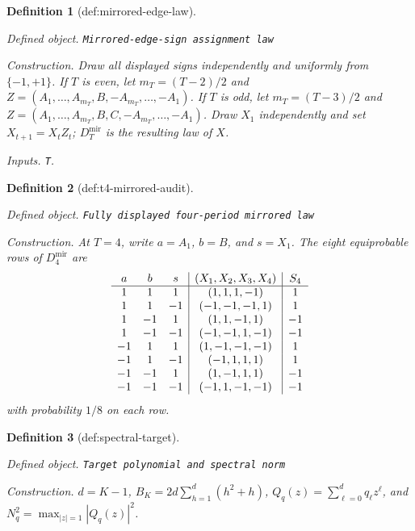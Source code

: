 \documentclass{article}
\newtheorem{definition}{Definition}
\begin{document}
\begin{definition}[def:mirrored-edge-law]\label{def:mirrored-edge-law}
\par\smallskip\noindent\emph{Defined object.} \texttt{Mirrored-\allowbreak{}edge-\allowbreak{}sign assignment law}
\par\smallskip\noindent\emph{Construction.} Draw all displayed signs independently and uniformly from \(\{-1,+1\}\). If \(T\) is even, let \(m_T=(T-2)/2\) and \(Z=(A_1,\ldots,A_{m_T},B,-A_{m_T},\ldots,-A_1)\). If \(T\) is odd, let \(m_T=(T-3)/2\) and \(Z=(A_1,\ldots,A_{m_T},B,C,-A_{m_T},\ldots,-A_1)\). Draw \(X_1\) independently and set \(X_{t+1}=X_tZ_t\); \(D_T^{\mathrm{mir}}\) is the resulting law of \(X\).
\par\smallskip\noindent\emph{Inputs.} \texttt{T}.
\end{definition}

\begin{definition}[def:t4-mirrored-audit]\label{def:t4-mirrored-audit}
\par\smallskip\noindent\emph{Defined object.} \texttt{Fully displayed four-\allowbreak{}period mirrored law}
\par\smallskip\noindent\emph{Construction.} At \(T=4\), write \(a=A_1\), \(b=B\), and \(s=X_1\). The eight equiprobable rows of \(D_4^{\mathrm{mir}}\) are \[\begin{array}{c c c|c|c}a&b&s&(X_1,X_2,X_3,X_4)&S_4\\\hline 1&1&1&(1,1,1,-1)&1\\1&1&-1&(-1,-1,-1,1)&1\\1&-1&1&(1,1,-1,1)&-1\\1&-1&-1&(-1,-1,1,-1)&-1\\-1&1&1&(1,-1,-1,-1)&1\\-1&1&-1&(-1,1,1,1)&1\\-1&-1&1&(1,-1,1,1)&-1\\-1&-1&-1&(-1,1,-1,-1)&-1\end{array}\] with probability \(1/8\) on each row.
\end{definition}

\begin{definition}[def:spectral-target]\label{def:spectral-target}
\par\smallskip\noindent\emph{Defined object.} \texttt{Target polynomial and spectral norm}
\par\smallskip\noindent\emph{Construction.} \(d=K-1\), \(B_K=2d\sum_{h=1}^{d}(h^2+h)\), \(Q_q(z)=\sum_{\ell=0}^{d}q_{\ell}z^{\ell}\), and \(N_q^2=\max_{|z|=1}|Q_q(z)|^2\).
\end{definition}
\end{document}
